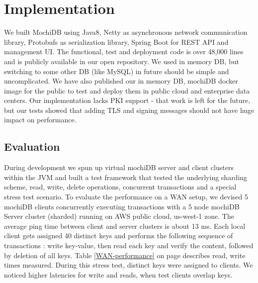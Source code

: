 \documentclass[letterpaper,twocolumn,10pt]{article}
\begin{document}
\section{Implementation}
We built MochiDB using Java8, Netty as asynchronous network communication library, Protobufs as serialization library, Spring Boot for REST API and management UI. The functional, test and deployment code is over 48,000 lines and is publicly available in our open repository\cite{Repository}. We used in memory DB, but switching to some other DB (like MySQL) in future should be simple and uncomplicated. We have also published our in memory DB, mochiDB docker image \cite{DockerHub} for the public to test and deploy them in public cloud and enterprise data centers. Our implementation lacks PKI support - that work is left for the future, but our tests showed that adding TLS and signing messages should not have huge impact on performance.  

\subsection{Evaluation}
During development we spun up virtual mochiDB server and client clusters within the JVM and built a test framework that tested the underlying sharding scheme, read, write, delete operations, concurrent transactions and a special stress test scenario. To evaluate the performance on a WAN setup, we devised 5 mochiDB clients concurrently executing transactions with a 5 node mochiDB Server cluster (sharded) running on AWS public cloud, us-west-1 zone. The average ping time between client and server clusters is about 13 ms. Each local client gets assigned 40 distinct keys and performs the following sequence of transactions : write key-value, then read each key and verify the content, followed by deletion of all keys. Table \ref{WAN-performance} on page \pageref{WAN-performance} describes read, write times measured. During this stress test, distinct keys were assigned to clients. We noticed higher latencies for write and reads, when test clients overlap keys.

\begin{table}[]
\centering
\caption{MochiDB WAN performance}
\label{WAN-performance}
\end{table}
\end{document}
